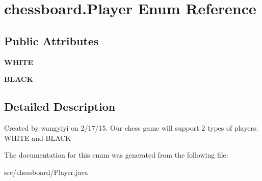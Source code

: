 \hypertarget{enumchessboard_1_1_player}{}\section{chessboard.\+Player Enum Reference}
\label{enumchessboard_1_1_player}
\subsection*{Public Attributes}
\begin{DoxyCompactItemize}
\item 
\hypertarget{enumchessboard_1_1_player_a4e15274b111d24e3d62dc2a169072b97}{}{\bfseries W\+H\+I\+T\+E}\label{enumchessboard_1_1_player_a4e15274b111d24e3d62dc2a169072b97}

\item 
\hypertarget{enumchessboard_1_1_player_ab0345c4225cc8b29adb0fcc81996863f}{}{\bfseries B\+L\+A\+C\+K}\label{enumchessboard_1_1_player_ab0345c4225cc8b29adb0fcc81996863f}

\end{DoxyCompactItemize}


\subsection{Detailed Description}
Created by wangyiyi on 2/17/15. Our chess game will support 2 types of players\+: W\+H\+I\+T\+E and B\+L\+A\+C\+K 

The documentation for this enum was generated from the following file\+:\begin{DoxyCompactItemize}
\item 
src/chessboard/Player.\+java\end{DoxyCompactItemize}

